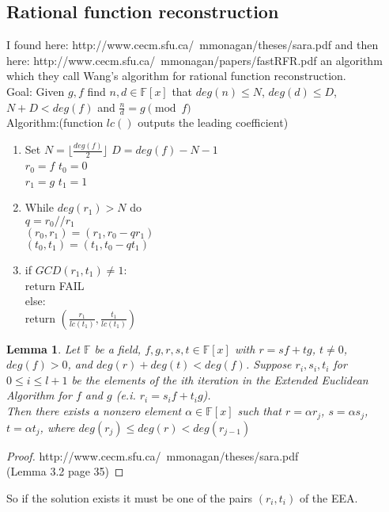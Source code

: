 \documentclass[12pt]{article}
\newcommand{\floor}[1]{\lfloor #1 \rfloor}
\newtheorem{lemma}{Lemma}
\begin{document}
\subsection{Rational function reconstruction}
I found here: http://www.cecm.sfu.ca/~mmonagan/theses/sara.pdf and then here: http://www.cecm.sfu.ca/~mmonagan/papers/fastRFR.pdf
an algorithm which they call Wang's algorithm for rational function reconstruction.\\
Goal: Given $g,f$ find $n, d \in \mathbb{F}[x]$ that $deg(n) \leq N$, $deg(d) \leq D$, $N + D < deg(f)$ and $\frac{n}{d} = g \pmod{f}$\\
Algorithm:(function $lc()$ outputs the leading coefficient)
\begin{enumerate}
	\item Set $N = \floor{\frac{deg(f)}{2}}$ $D = deg(f) - N - 1$\\
			$r_0 = f$  $t_0 = 0$\\
			$r_1 = g$  $t_1 = 1$\\
	\item While $deg(r_1) > N$ do\\
			$q = r_0 // r_1$\\
			$(r_0, r_1) = (r_1, r_0 - qr_1)$\\
			$(t_0, t_1) = (t_1, t_0 - qt_1)$\\
	\item if $GCD(r_1, t_1) \neq 1$:\\
			return FAIL\\
		  else:\\
			return $(\frac{r_1}{lc(t_1)}, \frac{t_1}{lc(t_1)})$
\end{enumerate}
\begin{lemma}
Let $\mathbb{F}$ be a field, $f, g, r, s, t \in \mathbb{F}[x]$ with $r = sf + tg$, $t \neq 0$, $deg(f) > 0$, and $deg(r) + deg(t) <deg(f)$.
Suppose $r_i, s_i, t_i$ for $0 \leq i \leq l + 1$ be the elements of the ith iteration in the Extended Euclidean Algorithm for $f$ and $g$ (e.i. $r_i = s_if + t_ig$). \\
Then there exists a nonzero element $\alpha \in \mathbb{F}[x]$ such that $r = \alpha r_j$, $s = \alpha s_j$, $t = \alpha t_j$, where $deg(r_j) \leq deg(r) < deg(r_{j-1})$
\end{lemma}
\begin{proof}
http://www.cecm.sfu.ca/~mmonagan/theses/sara.pdf \\(Lemma 3.2 page 35)
\end{proof}

So if the solution exists it must be one of the pairs $(r_i, t_i)$ of the EEA.
\end{document}
